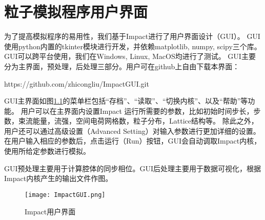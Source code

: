 
\chapter{粒子模拟程序用户界面}

为了提高模拟程序的易用性，我们基于Impact进行了用户界面设计（GUI）\cite{PIC_ji2000}。
GUI使用python内置的tkinter模块进行开发，并依赖matplotlib, numpy, scipy三个库。
GUI可以跨平台使用，我们在Windows, Linux, MacOS均进行了测试。
GUI主要分为主界面，预处理，后处理三部分。用户可在github上自由下载本界面：

\begin{center}
  https://github.com/zhicongliu/ImpactGUI.git
\end{center}

GUI主界面如图\ref{fig:ImpactGUI}的菜单栏包括“存档”、“读取”、“切换内核”、以及“帮助”等功能。
用户可以在主界面内设置Impact 运行所需要的参数，比如初始时间步长，步数，束流能量，流强，空间电荷网格数，粒子分布，Lattice结构等。
除此之外，用户还可以通过高级设置（Advanced Setting）对输入参数进行更加详细的设置。
在用户输入相应的参数后，点击运行（Run）按钮，GUI会自动调取Impact内核，使用所给定参数进行模拟。

GUI预处理主要用于计算腔体的同步相位。GUI后处理主要用于数据可视化，根据Impact内核产生的输出文件作图。


\begin{figure}
  \centering
  \texttt{[image: ImpactGUI.png]}
  \caption{Impact用户界面}\label{fig:ImpactGUI}
\end{figure}


